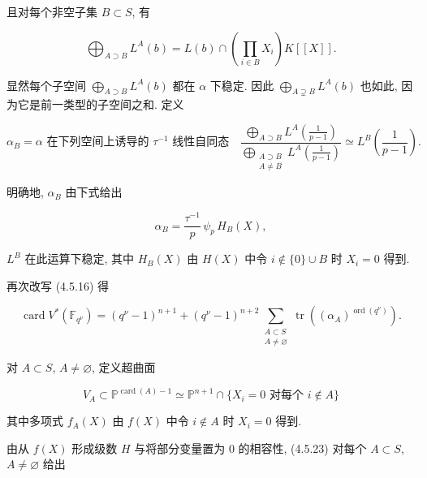 \par\medskip
且对每个非空子集 $B\subset S$, 有

\begin{equation}\tag{4.5.20}
\bigoplus_{A\supset B}L^A(b)
=L(b)\cap\left(\prod_{i\in B}X_i\right)K[[X]].
\end{equation}

显然每个子空间 $\bigoplus_{A\supset B}L^A(b)$ 都在 $\alpha$ 下稳定.
因此 $\bigoplus_{A\supsetneq B}L^A(b)$ 也如此, 因为它是前一类型的子空间之和.
定义

\begin{equation}\tag{4.5.21}
\alpha_B=\text{$\alpha$ 在下列空间上诱导的 $\tau^{-1}$ 线性自同态}
\quad
\frac{\displaystyle\bigoplus_{A\supset B}
L^A\!\left(\frac1{p-1}\right)}
{\displaystyle\bigoplus_{\substack{A\supset B\\A\ne B}}
L^A\!\left(\frac1{p-1}\right)}
\simeq L^B\!\left(\frac1{p-1}\right).
\end{equation}

明确地, $\alpha_B$ 由下式给出

\begin{equation}\tag{4.5.22}
\alpha_B=\frac{\tau^{-1}}p\,\psi_p\,H_B(X),
\end{equation}

$L^B$ 在此运算下稳定, 其中 $H_B(X)$ 由 $H(X)$ 中令 $i\notin\{0\}\cup B$ 时
$X_i=0$ 得到.

再次改写 (4.5.16) 得

\begin{equation}\tag{4.5.23}
\operatorname{card}V^*(\mathbb F_{q^\nu})
=(q^\nu-1)^{n+1}
+(q^\nu-1)^{n+2}
\sum_{\substack{A\subset S\\A\ne\varnothing}}
\operatorname{tr}\!\left((\alpha_A)^{\operatorname{ord}(q^\nu)}\right).
\end{equation}

对 $A\subset S$, $A\ne\varnothing$, 定义超曲面

\begin{equation}\tag{4.5.24}
V_A\subset\mathbb P^{\operatorname{card}(A)-1}
\simeq
\mathbb P^{n+1}\cap
\{X_i=0\text{ 对每个 }i\notin A\}
\end{equation}

其中多项式 $f_A(X)$ 由 $f(X)$ 中令 $i\notin A$ 时 $X_i=0$ 得到.

由从 $f(X)$ 形成级数 $H$ 与将部分变量置为 $0$ 的相容性,
(4.5.23) 对每个 $A\subset S$, $A\ne\varnothing$ 给出

